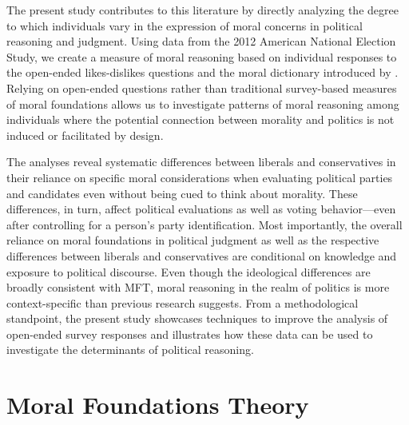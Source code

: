 \documentclass[12pt]{article}
\begin{document}
The present study contributes to this literature by directly analyzing the degree to which individuals vary in the expression of moral concerns in political reasoning and judgment. Using data from the 2012 American National Election Study, we create a measure of moral reasoning based on individual responses to the open-ended likes-dislikes questions and the moral dictionary introduced by \citet{graham2009liberals}. Relying on open-ended questions rather than traditional survey-based measures of moral foundations allows us to investigate patterns of moral reasoning among individuals where the potential connection between morality and politics is not induced or facilitated by design.

The analyses reveal systematic differences between liberals and conservatives in their reliance on specific moral considerations when evaluating political parties and candidates even without being cued to think about morality.
These differences, in turn, affect political evaluations as well as voting behavior---even after controlling for a person's party identification. Most importantly, the overall reliance on moral foundations in political judgment as well as the respective differences between liberals and conservatives are conditional on knowledge and exposure to political discourse. Even though the ideological differences are broadly consistent with MFT, moral reasoning in the realm of politics is more context-specific than previous research suggests. From a methodological standpoint, the present study showcases techniques to improve the analysis of open-ended survey responses and illustrates how these data can be used to investigate the determinants of political reasoning.

\section*{Moral Foundations Theory}
\end{document}

